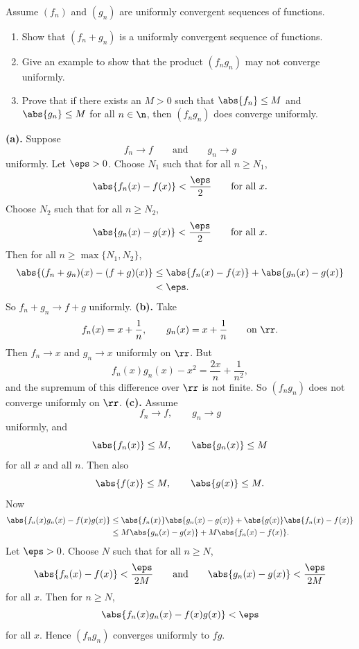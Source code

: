 \begin{problem}{
    Assume $(f_n)$ and $(g_n)$ are uniformly convergent sequences of functions.
    \begin{enumerate}[label={(\alph*)}]
	\item Show that $(f_n+g_n)$ is a uniformly convergent sequence of functions.
    \item Give an example to show that the product $(f_ng_n)$ may not converge uniformly.
    \item Prove that if there exists an $M>0$ such that $\abs{f_n}\leq M$ and $\abs{g_n}\leq M$ for all $n\in\n$, then $(f_ng_n)$ does converge uniformly.
    \end{enumerate}
}
    \textbf{(a).}
    Suppose
    \[
        f_n\to f
        \qquad\text{and}\qquad
        g_n\to g
    \]
    uniformly.
    Let $\eps>0$.
    Choose $N_1$ such that for all $n\geq N_1$,
    \[
        \abs{f_n(x)-f(x)}<\frac{\eps}{2}
        \qquad\text{for all }x.
    \]
    Choose $N_2$ such that for all $n\geq N_2$,
    \[
        \abs{g_n(x)-g(x)}<\frac{\eps}{2}
        \qquad\text{for all }x.
    \]
    Then for all $n\geq \max\{N_1,N_2\}$,
    \begin{align*}
        \abs{(f_n+g_n)(x)-(f+g)(x)}
        &\leq
        \abs{f_n(x)-f(x)}+\abs{g_n(x)-g(x)}\\
        &<\eps.
    \end{align*}
    So $f_n+g_n\to f+g$ uniformly.
    \textbf{(b).}
    Take
    \[
        f_n(x)=x+\frac1n,
        \qquad
        g_n(x)=x+\frac1n
        \qquad\text{on }\rr.
    \]
    Then $f_n\to x$ and $g_n\to x$ uniformly on $\rr$.
    But
    \[
        f_n(x)g_n(x)-x^2
        =
        \frac{2x}{n}+\frac1{n^2},
    \]
    and the supremum of this difference over $\rr$ is not finite.
    So $(f_ng_n)$ does not converge uniformly on $\rr$.
    \textbf{(c).}
    Assume
    \[
        f_n\to f,
        \qquad
        g_n\to g
    \]
    uniformly, and
    \[
        \abs{f_n(x)}\leq M,
        \qquad
        \abs{g_n(x)}\leq M
    \]
    for all $x$ and all $n$.
    Then also
    \[
        \abs{f(x)}\leq M,
        \qquad
        \abs{g(x)}\leq M.
    \]
    Now
    \begin{align*}
        \abs{f_n(x)g_n(x)-f(x)g(x)}
        &\leq
        \abs{f_n(x)}\abs{g_n(x)-g(x)}
        +
        \abs{g(x)}\abs{f_n(x)-f(x)}\\
        &\leq
        M\abs{g_n(x)-g(x)}
        +
        M\abs{f_n(x)-f(x)}.
    \end{align*}
    Let $\eps>0$.
    Choose $N$ such that for all $n\geq N$,
    \[
        \abs{f_n(x)-f(x)}<\frac{\eps}{2M}
        \qquad\text{and}\qquad
        \abs{g_n(x)-g(x)}<\frac{\eps}{2M}
    \]
    for all $x$.
    Then for $n\geq N$,
    \[
        \abs{f_n(x)g_n(x)-f(x)g(x)}<\eps
    \]
    for all $x$.
    Hence $(f_ng_n)$ converges uniformly to $fg$.
\end{problem}